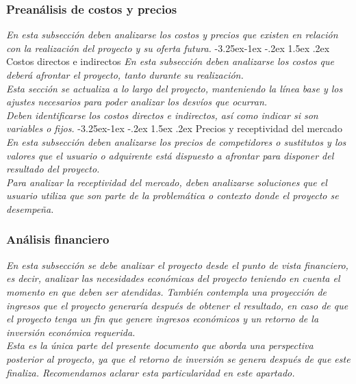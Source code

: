 \documentclass[12pt]{article}
\makeatletter
\renewcommand\paragraph{\@startsection{paragraph}{4}{\z@}%
                                     {-3.25ex\@plus -1ex \@minus -.2ex}%
                                     {1.5ex \@plus .2ex}%
                                     {\normalfont\normalsize\bfseries}}
\makeatother
\begin{document}
\subsubsection{Preanálisis de costos y precios}
{\it
En esta subsección deben analizarse los costos y precios que existen en relación con la realización del proyecto y su oferta futura.
}
    \paragraph{Costos directos e indirectos}
    {\it
    En esta subsección deben analizarse los costos que deberá afrontar el proyecto, tanto durante su realización.\\
    Esta sección se actualiza a lo largo del proyecto, manteniendo la línea base y los ajustes necesarios para poder analizar los desvíos que ocurran.\\
    Deben identificarse los costos directos e indirectos, así como indicar si son variables o fijos.
    }
    \paragraph{Precios y receptividad del mercado}
    {\it
    En esta subsección deben analizarse los precios de competidores o sustitutos y los valores que el usuario o adquirente está dispuesto a afrontar para disponer del resultado del proyecto.\\
    Para analizar la receptividad del mercado, deben analizarse soluciones que el usuario utiliza que son parte de la problemática o contexto donde el proyecto se desempeña.
   }


\subsubsection{Análisis financiero}
{\it
En esta subsección se debe analizar el proyecto desde el punto de vista financiero, es decir, analizar las necesidades económicas del proyecto teniendo en cuenta el momento en que deben ser atendidas. También contempla una proyección de ingresos que el proyecto generaría después de obtener el resultado, en caso de que el proyecto tenga un fin que genere ingresos económicos y un retorno de la inversión económica requerida.\\
Esta es la única parte del presente documento que aborda una perspectiva posterior al proyecto, ya que el retorno de inversión se genera después de que este finaliza. Recomendamos aclarar esta particularidad en este apartado.
}
\end{document}
